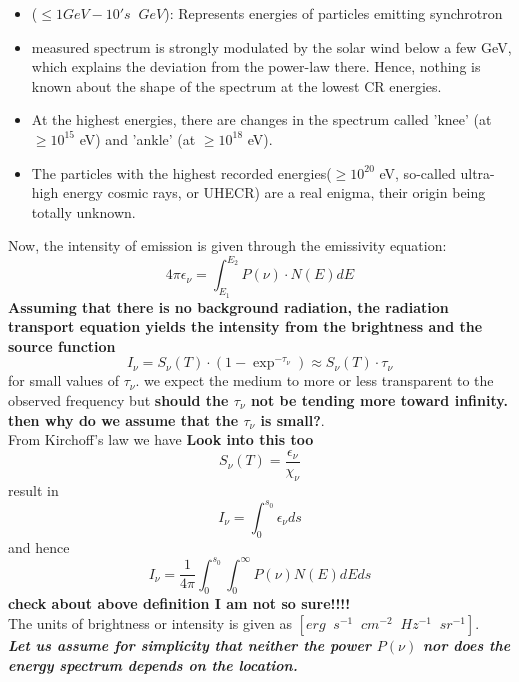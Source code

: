\documentclass[11pt]{report}
\newcommand{\tbf}[1]{\textbf{#1}}
\newcommand{\tit}[1]{\textit{#1}}
\newcommand{\rr}[1]{\left[{#1}\right]}
\begin{document}
\begin{itemize}
\item ($\leq 1GeV - 10's\;\;GeV$): Represents energies of particles emitting synchrotron
\item  measured spectrum is strongly modulated by the solar wind below a few GeV, which explains the deviation from the power-law there. Hence, nothing is known about the shape of the spectrum at the lowest CR energies. 
\item  At the highest energies, there are changes in the spectrum called 'knee' (at $\geq 10^{15}$ eV) and 'ankle' (at $\geq 10^{18}$ eV).
\item  The particles with the highest recorded energies($\geq 10^{20}$ eV, so-called ultra-high energy cosmic rays, or UHECR) are a real enigma, their origin being totally unknown.

\end{itemize}
Now, the intensity of emission is given through the emissivity equation:
\begin{equation}
4 \pi \epsilon_\nu=\int^{E_2}_{E_1}P(\nu)\cdot N(E)dE
\end{equation}
\textbf{Assuming that there is no background radiation, the radiation transport equation yields the intensity from the brightness and the source function}
\begin{equation}
I_\nu=S_\nu(T)\cdot (1-\exp^{-\tau_\nu}) \approx S_\nu(T)\cdot \tau_\nu
\end{equation}
for small values of $\tau_\nu$. we expect the medium to more or less transparent to the observed frequency but \textbf{should the $\tau_\nu$ not be tending more toward infinity. then why do we assume that the $\tau_\nu$ is small?}.\\
From Kirchoff's law we have \textbf{Look into this too}
\begin{equation}
S_\nu(T)=\frac{\epsilon_\nu}{\chi_\nu}
\end{equation}
result in
\begin{equation}
I_\nu=\int^{s_0}_0\epsilon_\nu ds
\end{equation}
and hence
\begin{equation}
I_\nu=\frac{1}{4\pi}\int^{s_0}_0 \int^{\infty}_0 P(\nu) N(E)dEds
\end{equation}
\textbf{check about above definition I am not so sure!!!!}\\
The units of brightness or intensity is given as $\rr{erg\;\;s^{-1}\;\;cm^{-2}\;\;Hz^{-1}\;\;sr^{-1}}$.\\
\tbf{\tit{ Let us assume for simplicity that neither the power $P(\nu)$ nor does the energy spectrum depends on the location.}}\\
\end{document}

